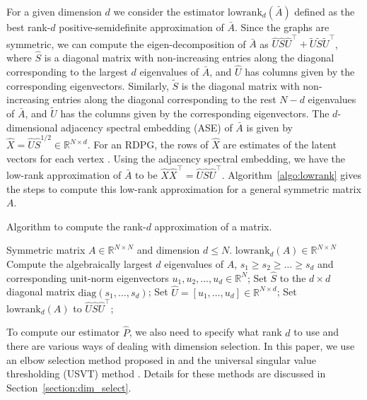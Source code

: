 \documentclass[10pt,letterpaper]{article}
\renewcommand{\Re}{\mathbb{R}}
\renewcommand{\hat}{\widehat}
\begin{document}
For a given dimension $d$ we consider the estimator $\mathrm{lowrank}_d(\bar{A})$ defined as the best rank-$d$ positive-semidefinite approximation of $\bar{A}$.
Since the graphs are symmetric, we can compute the eigen-decomposition of $\bar{A}$ as $\hat{U} \hat{S} \hat{U}^{\top} + \tilde{U}\tilde{S}\tilde{U}^{\top}$, where $\hat{S}$ is a diagonal matrix with non-increasing entries along the diagonal corresponding to the largest $d$ eigenvalues of $\bar{A}$, and $\hat{U}$ has columns given by the corresponding eigenvectors. Similarly, $\tilde{S}$ is the diagonal matrix with non-increasing entries along the diagonal corresponding to the rest $N - d$ eigenvalues of $\bar{A}$, and $\tilde{U}$ has the columns given by the corresponding eigenvectors.
The $d$-dimensional adjacency spectral embedding (ASE) of $\bar{A}$ is given by $\hat{X}=\hat{U} \hat{S}^{1/2}\in \Re^{N \times d}$.
For an RDPG, the rows of $\hat{X}$ are estimates of the latent vectors for each vertex \citep{sussman2014consistent}.
Using the adjacency spectral embedding, we have the low-rank approximation of $\bar{A}$ to be $\hat{X} \hat{X}^{\top}=\hat{U}\hat{S}\hat{U}^{\top}$.
Algorithm~\ref{algo:lowrank} gives the steps to compute this low-rank approximation for a general symmetric matrix $A$.

\begin{algorithm}[H]
\caption{Algorithm to compute the rank-$d$ approximation of a matrix.}
\label{algo:lowrank}
\begin{algorithmic}[1]
\REQUIRE Symmetric matrix $A\in \Re^{N\times N}$ and dimension $d\leq N$.
\ENSURE $\mathrm{lowrank}_d(A)\in \Re^{N\times N}$
\STATE Compute the algebraically largest $d$ eigenvalues of $A$, $s_1\geq s_2\geq \dotsc\geq s_d$ and corresponding unit-norm eigenvectors $u_1,u_2,\dotsc,u_d\in \Re^N$;
\STATE Set $\hat{S}$ to the $d\times d$ diagonal matrix $\mathrm{diag}(s_1,\dotsc,s_d)$;
\STATE Set $\hat{U} = [u_1,\dotsc,u_d]\in \Re^{N\times d}$;
\STATE Set $\mathrm{lowrank}_d(A)$ to $\hat{U}\hat{S}\hat{U}^{\top}$;
\end{algorithmic}
\end{algorithm}

To compute our estimator $\hat{P}$, we also need to specify what rank $d$ to use and there are various ways of dealing with dimension selection. 
In this paper, we use an elbow selection method proposed in \citet{zhu2006automatic} and the universal singular value thresholding (USVT) method \citep{chatterjee2015matrix}. 
Details for these methods are discussed in Section~\ref{section:dim_select}.
\end{document}
